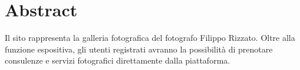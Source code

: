 \section{Abstract}
Il sito rappresenta la galleria fotografica del fotografo Filippo Rizzato. Oltre alla funzione espositiva, gli utenti registrati avranno la possibilità di prenotare consulenze e servizi fotografici direttamente dalla piattaforma.